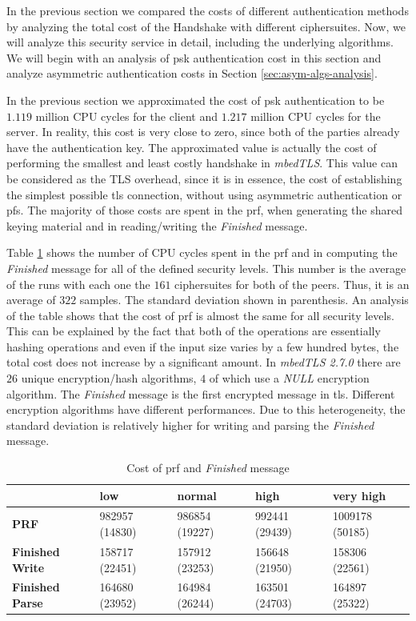 \documentclass{llncs}
\begin{document}
In the previous section we compared the costs of different authentication methods by analyzing the total cost of the
Handshake with different ciphersuites. Now, we will analyze this security service in detail, including the
underlying algorithms. We will begin with an analysis of \gls{psk} authentication cost in this section and 
analyze asymmetric authentication costs in Section \ref{sec:asym-algs-analysis}.

In the previous section we approximated the cost of \gls{psk} authentication to be $1.119$ million CPU cycles
for the client and $1.217$ million CPU cycles for the server. In reality, this cost is very close to zero, since
both of the parties already have the authentication key. The approximated value is actually the cost of performing the
smallest and least costly handshake in \textit{mbedTLS}.
This value can be considered as the TLS overhead, since it is in essence, the cost of establishing the simplest possible \gls{tls} connection,
without using asymmetric authentication or \gls{pfs}. The majority of those costs are spent in the \gls{prf}, when generating the
shared keying material and in reading/writing the \textit{Finished} message. 

Table \ref{table:hs-key-gen-cost} shows the number of CPU cycles spent in the \gls{prf}
and in computing the \textit{Finished} message for all of the defined security levels.
This number is the average of the runs with each one the $161$ ciphersuites for both of the peers. Thus, it is
an average of $322$ samples. The standard deviation shown in parenthesis.
An analysis of the table shows that the cost of \gls{prf} is almost the same for all security levels. This can be explained by
the fact that both of the operations are essentially hashing operations and even if the input size varies
by a few hundred bytes, the total cost does not increase by a significant amount.
In \textit{mbedTLS 2.7.0} there are $26$ unique encryption/hash algorithms, $4$ of which use a \textit{NULL} encryption algorithm.
The \textit{Finished} message is the first encrypted message in \gls{tls}. Different encryption algorithms have different
performances. Due to this heterogeneity, the standard deviation is relatively higher for writing and parsing the \textit{Finished} message.

\begin{table}[]
\begin{tabular}{|l|l|l|l|l|}
\hline
                        & \textbf{low}   & \textbf{normal} & \textbf{high}  & \textbf{very high} \\ \hline
\textbf{PRF}            & 982957 (14830) & 986854 (19227)  & 992441 (29439) & 1009178 (50185)    \\ \hline
\textbf{Finished Write} & 158717 (22451) & 157912 (23253)  & 156648 (21950) & 158306 (22561)     \\ \hline
\textbf{Finished Parse} & 164680 (23952) & 164984 (26244)  & 163501 (24703) & 164897 (25322)     \\ \hline
\end{tabular}
\centering \caption{\label{table:hs-key-gen-cost} Cost of \gls{prf} and \textit{Finished} message}
\end{table}
\end{document}
